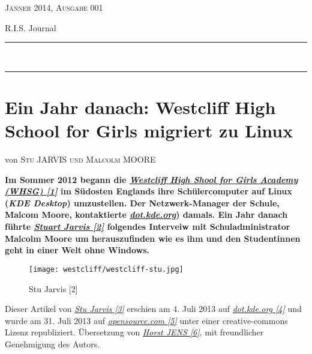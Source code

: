 \documentclass[10pt,a4paper,ngerman,twoside]{article} %
\newcommand{\HorRule}[1]{\noindent\rule{\linewidth}{#1}} %
\newcommand{\NewsletterName}[1]{ %
\begin{center}
\Huge \usefont{T1}{fvs}{b}{n} %
#1
\end{center}	
\par \normalsize \normalfont}
\newcommand{\JournalIssue}[1]{ %
\hfill \textsc{Jänner 2014, Ausgabe 001}
\par \normalsize \normalfont}
\newcommand{\NewsItem}[1]{ %
\usefont{T1}{fvs}{n}{n} %
\vspace{24pt}\large #1\vspace{3pt} %
\par \normalsize \normalfont}
\newcommand{\NewsAuthor}[1]{ %
\hfill von \textsc{#1} \vspace{20pt} %
\par \normalfont}
\begin{document}
\JournalIssue{1} %
\NewsletterName{R.I.S. Journal} %
\noindent\HorRule{3pt} \\[-0.75\baselineskip] %
\HorRule{1pt} %




%

\NewsItem{}
\section*{Ein Jahr danach: Westcliff High School for Girls migriert zu Linux} 
\label{westcliff}
\NewsAuthor{Stu JARVIS und Malcolm MOORE}

\textbf{Im Sommer 2012 begann die \href{http://www.whsg.info/index.php/extracurricular/it-and-software/open-source-software}{\textit{Westcliff High Shool for Girls Academy (WHSG) [1]}} im Südosten Englands ihre Schülercomputer auf Linux (\textit{KDE Desktop}) umzustellen. Der Netzwerk-Manager der Schule, Malcom Moore, kontaktierte \href{http://dot.kde.org/}{\textit{dot.kde.org}}) damals. Ein Jahr danach führte \href{http://dot.kde.org/users/stuart-jarvis}{\textit{Stuart Jarvis [2]}} folgendes Interveiw mit Schuladministrator Malcolm Moore um herauszufinden wie es ihm und den Studentinnen geht in einer Welt ohne Windows.}

\begin{figure}
\texttt{[image: westcliff/westcliff-stu.jpg]}\\
\caption{Stu Jarvis [2]}
\end{figure}

Dieser Artikel von \href{http://www.asinen.org/about/}{\textit{Stu Jarvis [3]}} erschien am 4. Juli 2013 auf \href{http://dot.kde.org/2013/07/04/year-linux-desktop}{\textit{dot.kde.org [4]}} und wurde am 31. Juli 2013 auf \href{http://opensource.com/education/13/7/linux-westcliff-high-school}{\textit{opensource.com [5]}} unter einer creative-commons Lizenz republiziert. Übersetzung von \href{http://spielend-programmieren.at}{\textit{Horst JENS [6]}}, mit freundlicher Genehmigung des Autors.
\end{document}
